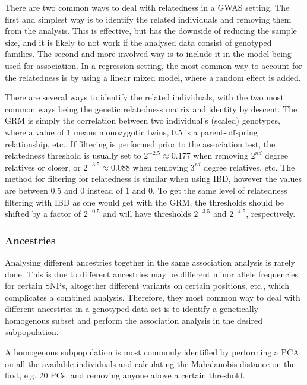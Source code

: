 There are two common ways to deal with relatedness in a GWAS setting. The first and simplest way is to identify the related individuals and removing them from the analysis. This is effective, but has the downside of reducing the sample size, and it is likely to not work if the analysed data consist of genotyped families. The second and more involved way is to include it in the model being used for association. In a regression setting, the most common way to account for the relatedness is by using a linear mixed model, where a random effect is added.

There are several ways to identify the related individuals, with the two most common ways being the genetic relatedness matrix and identity by descent. The GRM is simply the correlation between two individual's (scaled) genotypes, where a value of $ 1 $ means monozygotic twins, $ 0.5 $ is a parent-offspring relationship, etc.. If filtering is performed prior to the association test, the relatedness threshold is usually set to $ 2^{-2.5} \approx 0.177 $ when removing $ 2^{nd} $ degree relatives or closer, or $ 2^{-3.5} \approx 0.088 $ when removing $ 3^{rd} $ degree relatives, etc. The method for filtering for relatedness is similar when using IBD, however the values are between $ 0.5 $ and $ 0 $ instead of $ 1 $ and $ 0 $. To get the same level of relatedness filtering with IBD as one would get with the GRM, the thresholds should be shifted by a factor of $ 2^{-0.5} $ and will have thresholds $ 2^{-3.5} $ and $ 2^{-4.5} $, respectively. 


\subsubsection{Ancestries}   
Analysing different ancestries together in the same association analysis is rarely done. This is due to different ancestries may be different minor allele frequencies for certain SNPs, altogether different variants on certain positions, etc., which complicates a combined analysis. Therefore, they most common way to deal with different ancestries in a genotyped data set is to identify a genetically homogenous subset and perform the association analysis in the desired subpopulation. 

A homogenous subpopulation is most commonly identified by performing a PCA on all the available individuals and calculating the Mahalanobis distance on the first, e.g. 20 PCs, and removing anyone above a certain threshold\cite{prive2020efficient}. 
